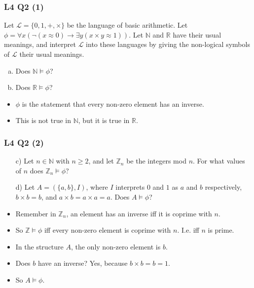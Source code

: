 \documentclass[handout]{beamer}
\newcommand{\bN}{\mathbb{N}}
\newcommand{\bZ}{\mathbb{Z}}
\newcommand{\bR}{\mathbb{R}}
\newcommand{\sL}{\mathscr{L}}
\begin{document}
\begin{frame}
\frametitle{L4 Q2 (1)}
Let $\sL=\{0,1,+,\times\}$ be the language of basic arithmetic. Let $\phi=\forall x(\neg(x\approx 0)\rightarrow \exists y(x\times y \approx 1))$. Let $\bN$ and $\bR$ have their usual meanings, and interpret $\sL$ into these languages by giving the non-logical symbols of $\sL$ their usual meanings. \vspace{0.4cm}
\begin{enumerate}[a)]
\item Does $\bN\models \phi$?
\item Does $\bR\models \phi$?
\end{enumerate} 
\vspace{0.5cm}
\begin{itemize}
\item $\phi$ is the statement that every non-zero element has an inverse.\vspace{0.2cm}
\item This is not true in $\bN$, but it is true in $\bR$. 
\end{itemize}
\end{frame}

\begin{frame}
\frametitle{L4 Q2 (2)}
\begin{enumerate}[]
\item[c)] Let $n\in\bN$ with $n\geq 2$, and let $\bZ_n$ be the integers mod $n$. For what values of $n$ does $\bZ_n\models \phi$? 
\item[d)] Let $A=(\{a,b\},I)$, where $I$ interprets $0$ and $1$ as $a$ and $b$ respectively, $b\times b = b$, and $a\times b = a\times a = a$. Does $A\models \phi$?
\end{enumerate} 
\vspace{0.5cm}
\begin{itemize}
\item Remember in $\bZ_n$, an element has an inverse iff it is coprime with $n$. 
\item So $\bZ\models \phi$ iff every non-zero element is coprime with $n$. I.e. iff $n$ is prime.\vspace{0.3cm}
\item In the structure $A$, the only non-zero element is $b$.
\item Does $b$ have an inverse? Yes, because $b\times b = b = 1$. 
\item So $A\models \phi$.
\end{itemize}
\end{frame}
\end{document}
